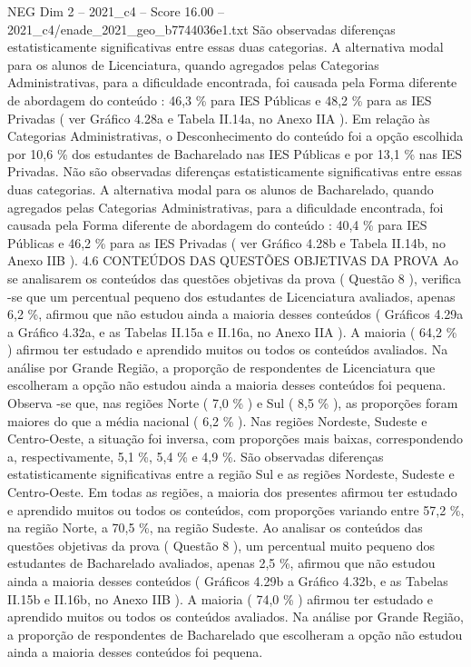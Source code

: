 \begin{textsample}{NEG Dim 2 – 2021\_c4 – Score 16.00 – 2021\_c4/enade\_2021\_geo\_b7744036e1.txt}
São observadas diferenças estatisticamente significativas entre essas duas categorias.
A alternativa modal para os alunos de Licenciatura, quando agregados pelas Categorias Administrativas, para a dificuldade encontrada, foi causada pela Forma diferente de abordagem do conteúdo : 46,3 \% para IES Públicas e 48,2 \% para as IES Privadas ( ver Gráfico 4.28a e Tabela II.14a, no Anexo IIA ).
Em relação às Categorias Administrativas, o Desconhecimento do conteúdo foi a opção escolhida por 10,6 \% dos estudantes de Bacharelado nas IES Públicas e por 13,1 \% nas IES Privadas.
Não são observadas diferenças estatisticamente significativas entre essas duas categorias.
A alternativa modal para os alunos de Bacharelado, quando agregados pelas Categorias Administrativas, para a dificuldade encontrada, foi causada pela Forma diferente de abordagem do conteúdo : 40,4 \% para IES Públicas e 46,2 \% para as IES Privadas ( ver Gráfico 4.28b e Tabela II.14b, no Anexo IIB ). 4.6 CONTEÚDOS DAS QUESTÕES OBJETIVAS DA PROVA Ao se analisarem os conteúdos das questões objetivas da prova ( Questão 8 ), verifica -se que um percentual pequeno dos estudantes de Licenciatura avaliados, apenas 6,2 \%, afirmou que não estudou ainda a maioria desses conteúdos ( Gráficos 4.29a a Gráfico 4.32a, e as Tabelas II.15a e II.16a, no Anexo IIA ).
A maioria ( 64,2 \% ) afirmou ter estudado e aprendido muitos ou todos os conteúdos avaliados.
Na análise por Grande Região, a proporção de respondentes de Licenciatura que escolheram a opção não estudou ainda a maioria desses conteúdos foi pequena.
Observa -se que, nas regiões Norte ( 7,0 \% ) e Sul ( 8,5 \% ), as proporções foram maiores do que a média nacional ( 6,2 \% ).
Nas regiões Nordeste, Sudeste e Centro-Oeste, a situação foi inversa, com proporções mais baixas, correspondendo a, respectivamente, 5,1 \%, 5,4 \% e 4,9 \%.
São observadas diferenças estatisticamente significativas entre a região Sul e as regiões Nordeste, Sudeste e Centro-Oeste.
Em todas as regiões, a maioria dos presentes afirmou ter estudado e aprendido muitos ou todos os conteúdos, com proporções variando entre 57,2 \%, na região Norte, a 70,5 \%, na região Sudeste.
Ao analisar os conteúdos das questões objetivas da prova ( Questão 8 ), um percentual muito pequeno dos estudantes de Bacharelado avaliados, apenas 2,5 \%, afirmou que não estudou ainda a maioria desses conteúdos ( Gráficos 4.29b a Gráfico 4.32b, e as Tabelas II.15b e II.16b, no Anexo IIB ).
A maioria ( 74,0 \% ) afirmou ter estudado e aprendido muitos ou todos os conteúdos avaliados.
Na análise por Grande Região, a proporção de respondentes de Bacharelado que escolheram a opção não estudou ainda a maioria desses conteúdos foi pequena.

\end{textsample}
